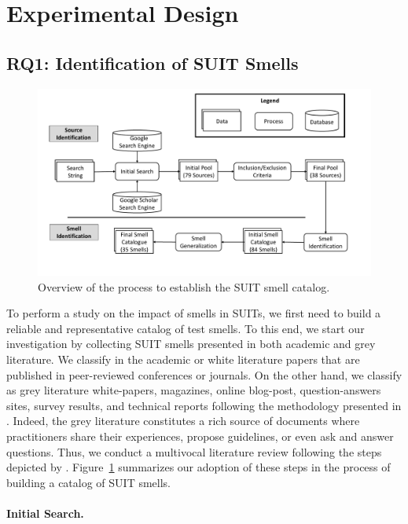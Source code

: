 \section{Experimental Design}
\label{sec:methodology}

\subsection{RQ1: Identification of SUIT Smells}
\label{sec:experience-design-smells-collection}
%
\begin{figure}
\centering
\includegraphics[width=\linewidth]{figures/smells/smell-catalgogue-process.pdf}
\caption{Overview of the process to establish the SUIT smell catalog.}  
\label{fig:smell-catalog-process}
\end{figure}

To perform a study on the impact of smells in SUITs, we first need to build a reliable and representative catalog of test smells. To this end, we start our investigation by collecting SUIT smells presented in both academic and grey literature. 
We classify in the academic or white literature papers that are published in peer-reviewed conferences or journals. On the other hand, we classify as grey literature white-papers, magazines, online blog-post, question-answers sites, survey results, and technical reports following the methodology presented in \textcite{Ricca2021}. Indeed, the grey literature constitutes a rich source of documents where practitioners share their experiences, propose guidelines, or even ask and answer questions. Thus, we conduct a multivocal literature review following the steps depicted by \textcite{Garousi2018}. 
Figure~\ref{fig:smell-catalog-process} summarizes our adoption of these steps in the process of building a catalog of SUIT smells.

\paragraph{\textbf{Initial Search.}}

